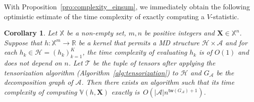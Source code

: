 \documentclass[sn-mathphys, natbib=false]{sn-jnl}
\newcommand{\libref}[2]{\href{#2}{\texttt{#1}}}
\theoremstyle{plain}
\newtheorem{lemma}{Lemma}
\newtheorem{corollary}{Corollary}
\theoremstyle{definition}
\newcommand{\vstat}{\mathbb{V}}
\newcommand{\samplespace}{\bbX}
\newcommand{\degp}[2]{\deg(#1,#2)}
\newcommand{\treewidthp}[1]{\mathsf{tw}(#1)}
\newcommand{\graphform}[1]{G_{#1}}
\newcommand{\less}{O}
\newcommand{\eliminatevg}[2]{\mathsf{elim}_{#1}(#2)}
\newcommand{\Lin}[1]{{\color{purple}{#1}}}
\newcommand{\bbR}{{\mathbb{R}}}
\def\bbX{\mathbb{X}}
\def\calA{\mathcal{A}}
\def\calT{\mathcal{T}}
\def\calH{\mathcal{H}}
\begin{document}
\begin{bibunit}[agsm]
With Proposition~\ref{pro:complexity_einsum}, we immediately obtain the following optimistic estimate of the time complexity of exactly computing a $V$-statistic.

\begin{corollary}\label{pro:complexity_v}
Let $\bbX$ be a non-empty set, $m, n$ be positive integers and $\bm{X} \in \samplespace^n$. Suppose that $h: \bbX^{m} \rightarrow \bbR$ be a kernel that permits a MD structure $\calH \times \calA$ and for each $h_k \in \calH = (h_k)_{k = 1}^{K}$, the time complexity of evaluating $h_k$ is of $O (1)$ and does not depend on $n$. Let $\calT$ be the tuple of tensors after applying the tensorization algorithm (Algorithm~\ref{alg:tensorization}) to $\calH$ and $G_\calA$ be the decomposition graph of $\calA$. Then there exists an algorithm such that its time complexity of computing $\vstat(h,\bm{X})$ exactly is~$\less(|\calA| n^{\treewidthp{G_\calA}+1})$. 
\end{corollary}







\end{bibunit}
\end{document}
